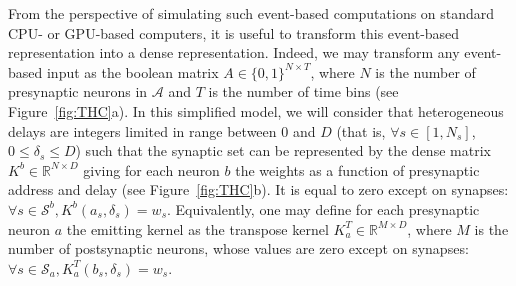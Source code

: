 \documentclass[runningheads]{llncs}
\newcommand{\presynaddr}{a} %
\newcommand{\postsynaddr}{b} %
\newcommand{\presynaddrspace}{\mathcal{A}} %
\newcommand{\synapse}{\mathcal{S}} %
\newcommand{\synapticweight}{w} %
\newcommand{\synapticdelay}{\delta} %
\newcommand{\ranksyn}{s} %
\newcommand{\Nsyn}{N_{s}} %
\newcommand{\kernel}{K} %
\begin{document}
From the perspective of simulating such event-based computations on standard CPU- or GPU-based computers, it is useful to transform this event-based representation into a dense representation. Indeed, we may transform any event-based input as the boolean matrix $A \in \{0, 1 \}^{N\times T}$, where $N$ is the number of presynaptic neurons in $\presynaddrspace$ and $T$ is the number of time bins (see Figure~\ref{fig:THC}a). In this simplified model, we will consider that heterogeneous delays are integers limited in range between $0$ and $D$ (that is, $\forall {\ranksyn \in [1,\Nsyn]}$, $0 \le \synapticdelay_\ranksyn \le D$) such that the synaptic set can be represented by the dense matrix $\kernel^\postsynaddr \in \mathbb{R}^{N\times D}$ giving for each neuron $\postsynaddr$ the weights as a function of presynaptic address and delay (see Figure~\ref{fig:THC}b). It is equal to zero except on synapses: $\forall {\ranksyn \in \synapse^\postsynaddr}, \kernel^\postsynaddr(\presynaddr_\ranksyn,  \synapticdelay_\ranksyn) = \synapticweight_\ranksyn$. Equivalently, one may define for each presynaptic neuron $\presynaddr$ the emitting kernel as the transpose kernel $\kernel^T_\presynaddr \in \mathbb{R}^{M\times D}$, where $M$ is the number of postsynaptic neurons, whose values are zero except on synapses:  $\forall {\ranksyn \in \synapse_\presynaddr}, \kernel^T_\presynaddr(\postsynaddr_\ranksyn,  \synapticdelay_\ranksyn) = \synapticweight_\ranksyn$.
\end{document}
